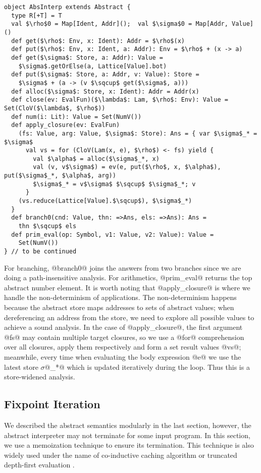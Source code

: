 \begin{lstlisting}
object AbsInterp extends Abstract {
  type R[+T] = T
  val $\rho$0 = Map[Ident, Addr]();  val $\sigma$0 = Map[Addr, Value]()
  def get($\rho$: Env, x: Ident): Addr = $\rho$(x)
  def put($\rho$: Env, x: Ident, a: Addr): Env = $\rho$ + (x -> a)
  def get($\sigma$: Store, a: Addr): Value = 
    $\sigma$.getOrElse(a, Lattice[Value].bot)
  def put($\sigma$: Store, a: Addr, v: Value): Store =
    $\sigma$ + (a -> (v $\sqcup$ get($\sigma$, a)))
  def alloc($\sigma$: Store, x: Ident): Addr = Addr(x)
  def close(ev: EvalFun)($\lambda$: Lam, $\rho$: Env): Value = Set(CloV($\lambda$, $\rho$))
  def num(i: Lit): Value = Set(NumV())
  def apply_closure(ev: EvalFun)
    (fs: Value, arg: Value, $\sigma$: Store): Ans = { var $\sigma$_* = $\sigma$
      val vs = for (CloV(Lam(x, e), $\rho$) <- fs) yield {
        val $\alpha$ = alloc($\sigma$_*, x)
        val (v, v$\sigma$) = ev(e, put($\rho$, x, $\alpha$), put($\sigma$_*, $\alpha$, arg))
        $\sigma$_* = v$\sigma$ $\sqcup$ $\sigma$_*; v
      }
    (vs.reduce(Lattice[Value].$\sqcup$), $\sigma$_*)
  }
  def branch0(cnd: Value, thn: =>Ans, els: =>Ans): Ans = 
    thn $\sqcup$ els
  def prim_eval(op: Symbol, v1: Value, v2: Value): Value = 
    Set(NumV())
} // to be continued
\end{lstlisting}

For branching, @branch0@ joins the answers from two branches since we are doing
a path-insensitive analysis. For arithmetics, @prim_eval@ returns the top
abstract number element. It is worth noting that @apply_closure@ is where we
handle the non-determinism of applications. The non-determinism happens because
the abstract store maps addresses to sets of abstract values; when dereferencing
an address from the store, we need to explore all possible values to achieve a
sound analysis. In the case of @apply_closure@, the first argument @fs@ may
contain multiple target closures, so we use a @for@ comprehension over all
closures, apply them respectively and form a set result values @vs@; meanwhile,
every time when evaluating the body expression @e@ we use the latest store
$\sigma$@_*@ which is updated iteratively during the loop. Thus this is a
store-widened analysis.

\subsection{Fixpoint Iteration}

We described the abstract semantics modularly in the last section, however, the
abstract interpreter may not terminate for some input program. In this section,
we use a memoization technique to ensure its termination. This technique is also
widely used under the name of co-inductive caching algorithm
\cite{DBLP:journals/pacmpl/DaraisLNH17, Wei:2018:RAA:3243631.3236800} or
truncated depth-first evaluation \cite{Rosendahl:AbsIntPL}.

